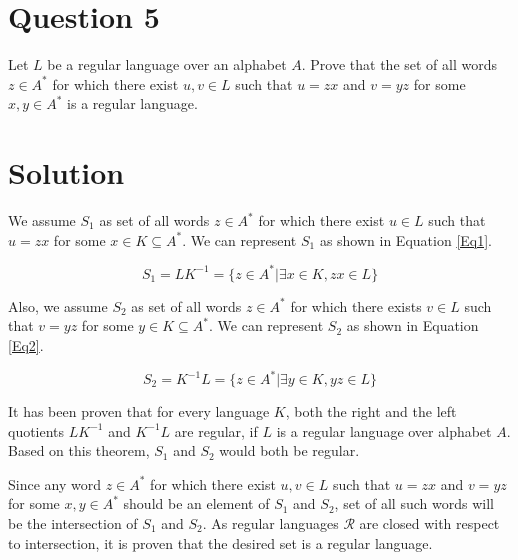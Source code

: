 \section*{Question 5}

Let $L$ be a regular language over an alphabet $A$.
Prove that the set of all words $z \in A^*$ for which there exist $u,v \in L$ such that $u = zx$ and $v=yz$ for some $x,y \in A^*$ is a regular language.

\section*{Solution}

We assume $S_1$ as set of all words $z \in A^*$ for which there exist $u \in L$ such that $u=zx$ for some $x \in K \subseteq A^*$.
We can represent $S_1$ as shown in Equation \ref{Eq1}.

\begin{equation}\label{Eq1}
	S_1 = LK^{-1} = \{z\in A^* | \exists x\in K, zx\in L\}
\end{equation}

Also, we assume $S_2$ as set of all words $z \in A^*$ for which there exists $v \in L$ such that $v = yz$ for some $y \in K \subseteq A^*$.
We can represent $S_2$ as shown in Equation \ref{Eq2}.

\begin{equation}\label{Eq2}
	S_2 = K^{-1}L = \{z\in A^* | \exists y\in K, yz\in L\}
\end{equation}

It has been proven \cite{simovici1999theory} that for every language $K$, both the right and the left quotients $LK^{-1}$ and $K^{-1}L$ are regular, if $L$ is a regular language over alphabet $A$.
Based on this theorem, $S_1$ and $S_2$ would both be regular.

Since any word $z \in A^*$ for which there exist $u,v \in L$ such that $u = zx$ and $v=yz$ for some $x,y \in A^*$ should be an element of $S_1$ and $S_2$, set of all such words will be the intersection of $S_1$ and $S_2$.
As regular languages $\mathcal{R}$ are closed with respect to intersection, it is proven that the desired set is a regular language.
